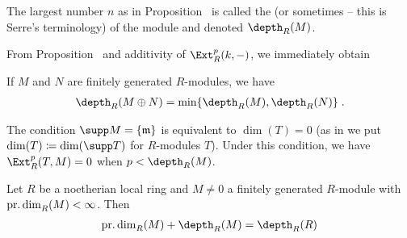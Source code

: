 \documentclass[a4paper,parskip=half,numbers=enddot, DIV=12]{scrreprt}
\begin{document}
\begin{defi}
	The largest number $n$ as in Proposition~ is called the  (or sometimes  -- this is Serre's terminology) of the module and denoted $\depth_R(M)$.
\end{defi}
From Proposition~ and additivity of $\Ext_R^p(k,-)$, we immediately obtain
\begin{fact}
	If $M$ and $N$ are finitely generated $R$-modules, we have 
	\begin{align*}
		\depth_R(M\oplus N)=\min\{\depth_R(M),\depth_R(N)\}\;.
	\end{align*}
\end{fact}
\begin{rem}
	The condition $\supp M=\{\mm\}$ is equivalent to $\dim (T)=0$ (as in \cite[Definition~3.4.1]{alg2} we put $\dim(T)\coloneqq\dim(\supp T)$ for $R$-modules $T$). Under this condition, we have $\Ext_R^p(T,M)=0$ when $p<\depth_R(M)$.
\end{rem}
\begin{thm}
	Let $R$ be a noetherian local ring and $M\neq 0$ a finitely generated $R$-module with $\operatorname{pr.dim}_R(M)<\infty$. Then
	\begin{align}\lbl{eq:AuslanderBuchsbaum}
		\pdim_R(M)+\depth_R(M)=\depth_R(R)
	\end{align}
\end{thm}
\end{document}
